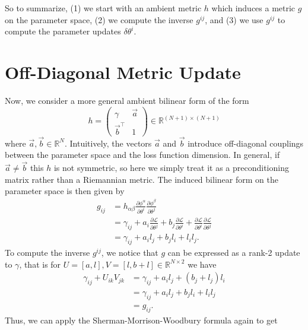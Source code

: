 \documentclass{article}
\newcommand{\loss}{\mathcal{L}}
\begin{document}
So to summarize, (1) we start with an ambient metric $h$ which induces a metric $g$ on the parameter space, 
(2) we compute the inverse $g^{ij}$, and 
(3) we use $g^{ij}$ to compute the parameter updates $\delta \theta^i$.



\section{Off-Diagonal Metric Update}
Now, we consider a more general ambient bilinear form of the form $$
    h = \begin{pmatrix} \gamma & \vec{a} \\ \vec{b}^\top & 1 \end{pmatrix}\in\mathbb{R}^{(N+1)\times(N+1)}
$$ where $\vec{a},\vec{b}\in\mathbb{R}^N$.
Intuitively, the vectors $\vec{a}$ and $\vec{b}$ introduce off-diagonal couplings between the parameter space and the loss function dimension.
In general, if $\vec{a}\neq \vec{b}$ this $h$ is not symmetric, so here we simply treat it as a preconditioning matrix rather than a Riemannian metric.
The induced bilinear form on the parameter space is then given by
\begin{align*}
    g_{ij} 
    &= h_{\alpha\beta} \frac{\partial \phi^\alpha}{\partial \theta^i} \frac{\partial \phi^\beta}{\partial \theta^j} \\
    &= \gamma_{ij} + a_i \frac{\partial \loss}{\partial \theta^j} + b_j \frac{\partial \loss}{\partial \theta^i} + \frac{\partial \loss}{\partial \theta^i} \frac{\partial \loss}{\partial \theta^j} \\
    &= \gamma_{ij} + a_i l_j + b_j l_i + l_i l_j.
\end{align*}
To compute the inverse $g^{ij}$, we notice that $g$ can be expressed as a rank-2 update to $\gamma$, 
that is for $U=[a, l], V=[l, b + l]\in\mathbb{R}^{N\times 2}$ we have
\begin{align*}
    \gamma_{ij} + U_{ik} V_{jk} 
    &= \gamma_{ij} + a_i l_j + (b_j + l_j) l_i \\
    &= \gamma_{ij} + a_i l_j + b_j l_i + l_i l_j \\
    &= g_{ij}.
\end{align*}
Thus, we can apply the Sherman-Morrison-Woodbury formula again to get
\end{document}
